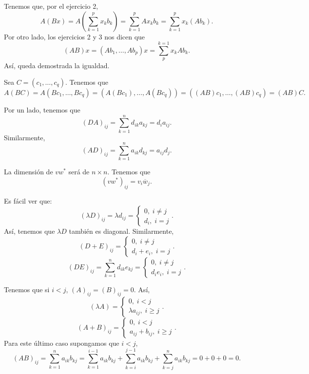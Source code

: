 \documentclass{article}
\begin{document}
\begin{ej}
Tenemos que, por el ejercicio 2,
\[A\left(Bx\right) = A\left(\sum^{p}_{k = 1}x_{k}b_{k}\right) = \sum^{p}_{k = 1}Ax_{k}b_{k} = \sum^{p}_{k = 1}x_{k}\left(Ab_{k}\right)  .\]
Por otro lado, los ejercicios 2 y 3 nos dicen que
\[\left(AB\right)x = \left(Ab_{1}, \ldots, Ab_{p}\right)x = \sum^{k = 1}_{p}x_{k}Ab_{k} .\]
Así, queda demostrada la igualdad. 
\end{ej}
\begin{ej}
Sea $\displaystyle C = \left(c_{1}, \ldots, c_{q}\right) $. Tenemos que
\[A\left(BC\right) = A\left(Bc_{1}, \ldots, Bc_{q}\right) = \left(A\left(Bc_{1}\right), \ldots, A\left(Bc_{q}\right)\right) = \left(\left(AB\right)c_{1}, \ldots, \left(AB\right)c_{q}\right) = \left(AB\right)C .\]
\end{ej}
\begin{ej}
Por un lado, tenemos que 
\[\left(DA\right)_{ij} = \sum^{n}_{k = 1}d _{ik}a_{kj} = d _{i}a_{ij} .\]
Similarmente, 
\[\left(AD\right)_{ij } = \sum^{n}_{ k= 1}a_{ik}d _{kj } = a_{ij }d _{j} .\]
\end{ej}
\begin{ej}
La dimensión de $\displaystyle v w^{*} $ será de $\displaystyle n \times n $. Tenemos que 
\[\left(vw^{*}\right)_{ij} = v_{i}\overline{w}_{j}.\]
\end{ej}
\begin{ej}
Es fácil ver que:
\[\left(\lambda D\right)_{ij} = \lambda d _{ij} = 
\begin{cases}
0, \; i \neq j \\
d _{i},\; i = j
\end{cases}
.\]
Así, tenemos que $\displaystyle \lambda D $ también es diagonal. Similarmente, 
\[\left(D + E\right)_{ij} = 
\begin{cases}
0, \; i \neq j \\
d _{i}+ e_{i} ,\; i = j
\end{cases}
.\]
\[\left(DE\right)_{ij} = \sum^{n}_{k = 1}d _{ik} e _{kj} = 
\begin{cases}
0, \; i \neq j \\
d _{i}e_{i}, \; i = j
\end{cases}
.\]
\end{ej}
\begin{ej}
Tenemos que si $\displaystyle i < j $, $\displaystyle \left(A\right)_{ij} = \left(B\right)_{ij} = 0 $. Así, 
\[\left(\lambda A\right) = 
\begin{cases}
0, \; i < j \\
\lambda a_{ij}, \; i \geq j
\end{cases}
.\]
\[\left(A + B\right) _{ij } = 
\begin{cases}
0, \; i < j \\
a_{ij} + b_{ij}, \; i \geq j
\end{cases}
.\]
Para este último caso supongamos que $\displaystyle i < j $,
\[\left(AB\right)_{ij } = \sum^{n}_{k= 1} a_{ik}b_{kj} = \sum^{i-1}_{k = 1}a_{ik}b_{kj} + \sum^{j - 1}_{k = i}a_{ik}b_{kj} + \sum^{n}_{k = j}a_{ik}b_{kj} = 0 + 0 + 0 = 0
.\]
\end{ej}
\end{document}
